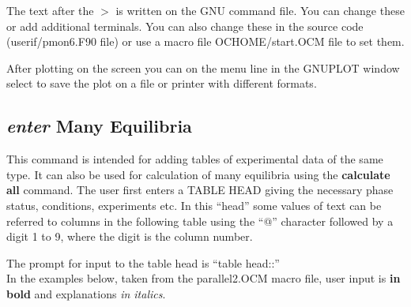 \documentclass[11pt]{article}
\begin{document}
The text after the $>$ is written on the GNU command file.  You can
change these or add additional terminals.  You can also change these
in the source code (userif/pmon6.F90 file) or use a macro file
OCHOME/start.OCM file to set them.

After plotting on the screen you can on the menu line in the GNUPLOT
window select to save the plot on a file or printer with different
formats.

\hypertarget{Enter many equil}{}
\subsection{{\em enter} Many Equilibria}\label{sc:entermany}

This command is intended for adding tables of experimental data of the
same type.  It can also be used for calculation of many equilibria
using the {\bf calculate all} command.  The user first enters a TABLE
HEAD giving the necessary phase status, conditions, experiments etc.
In this ``head'' some values of text can be referred to columns in the
following table using the ``@'' character followed by a digit 1 to 9,
where the digit is the column number.

The prompt for input to the table head is ``table head::''\\ In the
examples below, taken from the parallel2.OCM macro file, user input is
{\bf in bold} and explanations {\em in italics}.
\end{document}
